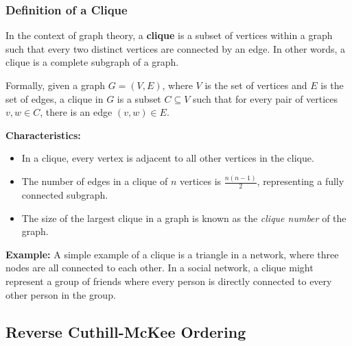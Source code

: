 \documentclass[unicode,11pt,a4paper,oneside,numbers=endperiod,openany]{scrartcl}
\begin{document}
\subsubsection{Definition of a Clique}

In the context of graph theory, a \textbf{clique} is a subset of vertices within a graph such that every two distinct vertices are connected by an edge. In other words, a clique is a complete subgraph of a graph.

Formally, given a graph \( G = (V, E) \), where \( V \) is the set of vertices and \( E \) is the set of edges, a clique in \( G \) is a subset \( C \subseteq V \) such that for every pair of vertices \( v, w \in C \), there is an edge \( (v, w) \in E \).

\textbf{Characteristics:}
\begin{itemize}
    \item In a clique, every vertex is adjacent to all other vertices in the clique.
    \item The number of edges in a clique of \( n \) vertices is \( \frac{n(n-1)}{2} \), representing a fully connected subgraph.
    \item The size of the largest clique in a graph is known as the \textit{clique number} of the graph.
\end{itemize}

\textbf{Example:}
A simple example of a clique is a triangle in a network, where three nodes are all connected to each other. In a social network, a clique might represent a group of friends where every person is directly connected to every other person in the group.



\subsection{Reverse Cuthill-McKee Ordering}
\end{document}

